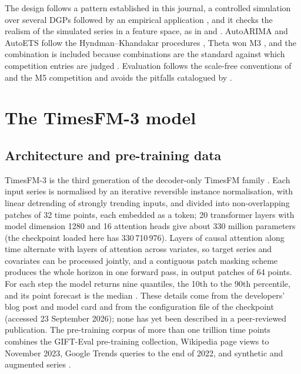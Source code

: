 The design follows a pattern established in this journal, a controlled simulation over several DGPs
followed by an empirical application \citep{berger2025deep, chu2026intervals, lisi2025multiple}, and it
checks the realism of the simulated series in a feature space, as in \citet{kang2017instance} and
\citet{talagala2023metalearning}. AutoARIMA and AutoETS follow the Hyndman--Khandakar procedures
\citep{hyndman2008forecast, hyndman2002statespace}, Theta \citep{assimakopoulos2000theta} won M3
\citep{makridakis2000m3}, and the combination is included because combinations are the standard against
which competition entries are judged \citep{makridakis2000m3, makridakis2020m4}. Evaluation follows the
scale-free conventions of \citet{hyndman2006mase} and the M5 competition \citep{makridakis2022m5,
makridakis2022m5unc} and avoids the pitfalls catalogued by \citet{hewamalage2023evaluation}.

\section{The TimesFM-3 model}
\label{sec:timesfm}

\subsection{Architecture and pre-training data}
\label{sec:tfm-architecture}

TimesFM-3 is the third generation of the decoder-only TimesFM family \citep{das2024timesfm,
timesfm3blog}. Each input series is normalised by an iterative reversible instance normalisation, with
linear detrending of strongly trending inputs, and divided into non-overlapping patches of 32 time points,
each embedded as a token; 20 transformer layers with model dimension 1280 and 16 attention heads give
about 330 million parameters (the checkpoint loaded here has 330\,710\,976). Layers of causal attention
along time alternate with layers of attention across variates, so target series and covariates can be
processed jointly, and a contiguous patch masking scheme produces the whole horizon in one forward pass,
in output patches of 64 points. For each step the model returns nine quantiles, the 10th to the 90th
percentile, and its point forecast is the median \citep{timesfm3blog, timesfm3card, timesfm3repo}. These
details come from the developers' blog post and model card and from the configuration file of the
checkpoint (accessed 23 September 2026); none has yet been described in a peer-reviewed publication. The
pre-training corpus of more than one trillion time points combines the GIFT-Eval pre-training collection,
Wikipedia page views to November 2023, Google Trends queries to the end of 2022, and synthetic and
augmented series \citep{timesfm3card}.

